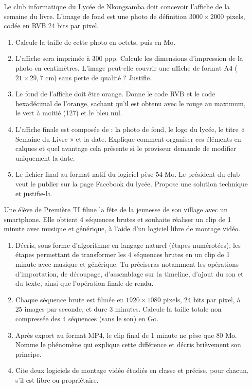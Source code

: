\documentclass[11pt]{article}
\begin{document}
\begin{exercice}
Le club informatique du Lycée de Nkongsamba doit concevoir l'affiche de la semaine du livre. L'image de fond est une photo de définition $3000 \times 2000$ pixels, codée en RVB 24 bits par pixel.
\begin{enumerate}
  \item Calcule la taille de cette photo en octets, puis en Mo.
  \item L'affiche sera imprimée à 300 ppp. Calcule les dimensions d'impression de la photo en centimètres. L'image peut-elle couvrir une affiche de format A4 ($21 \times 29,7$ cm) sans perte de qualité ? Justifie.
  \item Le fond de l'affiche doit être orange. Donne le code RVB et le code hexadécimal de l'orange, sachant qu'il est obtenu avec le rouge au maximum, le vert à moitié (127) et le bleu nul.
  \item L'affiche finale est composée de : la photo de fond, le logo du lycée, le titre « Semaine du Livre » et la date. Explique comment organiser ces éléments en calques et quel avantage cela présente si le proviseur demande de modifier uniquement la date.
  \item Le fichier final au format natif du logiciel pèse 54 Mo. Le président du club veut le publier sur la page Facebook du lycée. Propose une solution technique et justifie-la.
\end{enumerate}
\end{exercice}

\begin{exercice}
Une élève de Première TI filme la fête de la jeunesse de son village avec un smartphone. Elle obtient 4 séquences brutes et souhaite réaliser un clip de 1 minute avec musique et générique, à l'aide d'un logiciel libre de montage vidéo.
\begin{enumerate}
  \item Décris, sous forme d'algorithme en langage naturel (étapes numérotées), les étapes permettant de transformer les 4 séquences brutes en un clip de 1 minute avec musique et générique. Tu préciseras notamment les opérations d'importation, de découpage, d'assemblage sur la timeline, d'ajout du son et du texte, ainsi que l'opération finale de rendu.
  \item Chaque séquence brute est filmée en $1920 \times 1080$ pixels, 24 bits par pixel, à 25 images par seconde, et dure 3 minutes. Calcule la taille totale non compressée des 4 séquences (sans le son) en Go.
  \item Après export au format MP4, le clip final de 1 minute ne pèse que 80 Mo. Nomme le phénomène qui explique cette différence et décris brièvement son principe.
  \item Cite deux logiciels de montage vidéo étudiés en classe et précise, pour chacun, s'il est libre ou propriétaire.
\end{enumerate}
\end{exercice}
\end{document}
